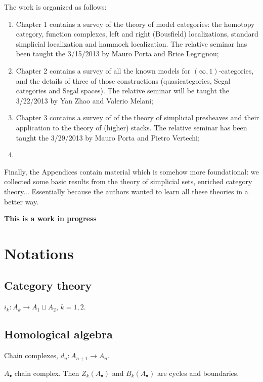 \documentclass[a4paper]{memoir}
\theoremstyle{plain}
\theoremstyle{definition}
\theoremstyle{remark}
\begin{document}
The work is organized as follows:

\begin{enumerate}
\item Chapter 1 contains a survey of the theory of model categories: the homotopy category, function complexes, left and right (Bousfield) localizations, standard simplicial localization and hammock localization. The relative seminar has been taught the 3/15/2013 by Mauro Porta and Brice Legrignou;
\item Chapter 2 contains a survey of all the known models for $(\infty,1)$-categories, and the details of three of those constructions (quasicategories, Segal categories and Segal spaces). The relative seminar will be taught the 3/22/2013 by Yan Zhao and Valerio Melani;
\item Chapter 3 contains a survey of of the theory of simplicial presheaves and their application to the theory of (higher) stacks. The relative seminar has been taught the 3/29/2013 by Mauro Porta and Pietro Vertechi;
\item
\end{enumerate}

Finally, the Appendices contain material which is somehow more foundational: we collected some basic results from the theory of simplicial sets, enriched category theory... Essentially because the authors wanted to learn all these theories in a better way.

{\bfseries This is a work in progress}

\listoftodos

\section*{Notations}

\subsection*{Category theory}

$i_k \colon A_k \to A_1 \sqcup A_2$, $k = 1,2$.

\subsection*{Homological algebra}

Chain complexes, $d_n \colon A_{n+1} \to A_n$.

$A_\bullet$ chain complex. Then $Z_k(A_\bullet)$ and $B_k(A_\bullet)$ are cycles and boundaries.
\end{document}
